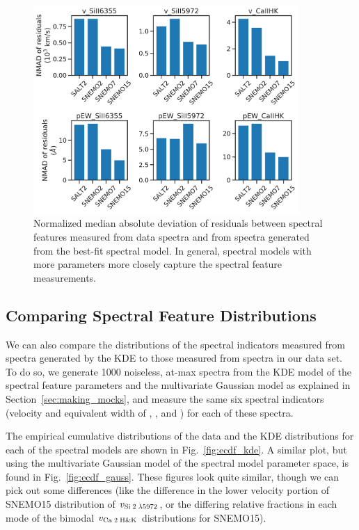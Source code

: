 \begin{figure}
    \centering
    \includegraphics[width=0.9\textwidth]{figures/snemo_kde/model_spec_feat_recovery.pdf}
    \caption{Normalized median absolute deviation of residuals between spectral features measured from data spectra and from spectra generated from the best-fit spectral model. In general, spectral models with more parameters more closely capture the spectral feature measurements.}
    \label{fig:model_spec_feat_recovery}
\end{figure}

\subsection{Comparing Spectral Feature Distributions}
We can also compare the distributions of the spectral indicators measured from spectra generated by the KDE to those measured from spectra in our data set. To do so, we generate 1000 noiseless, at-max spectra from the KDE model of the spectral feature parameters and the multivariate Gaussian model as explained in Section~\ref{sec:making_mocks}, and measure the same six spectral indicators (velocity and equivalent width of \SiIIred, \SiIIblue, and \CaIIHK) for each of these spectra.

The empirical cumulative distributions of the data and the KDE distributions for each of the spectral models are shown in Fig.~\ref{fig:ecdf_kde}. A similar plot, but using the multivariate Gaussian model of the spectral model parameter space, is found in Fig.~\ref{fig:ecdf_gauss}. These figures look quite similar, though we can pick out some differences (like the difference in the lower velocity portion of SNEMO15 distribution of $v_\text{Si$\;${\scshape{2}}\;$\lambda$5972}$, or the differing relative fractions in each mode of the bimodal $v_\text{Ca$\;${\scshape{2}}\;H\&K{}}$ distributions for SNEMO15).

